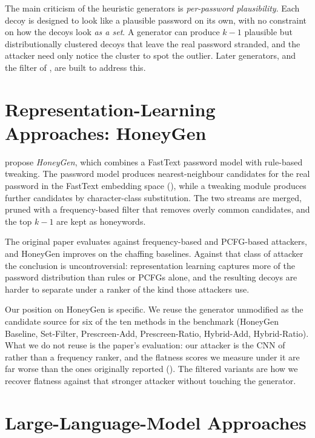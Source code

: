 The main criticism of the heuristic generators is
\emph{per-password plausibility}. Each decoy is designed to look like a
plausible password on its own, with no constraint on how the decoys look
\emph{as a set}. A generator can produce $k-1$ plausible but
distributionally clustered decoys that leave the real password
stranded, and the attacker need only notice the cluster to spot the
outlier. Later generators, and the filter of ,
are built to address this.

\section{Representation-Learning Approaches: HoneyGen}
\label{sec:related-honeygen}

\textcite{dionysiou2021honeygen} propose \emph{HoneyGen}, which combines
a FastText password model with rule-based tweaking. The password model
produces nearest-neighbour candidates for the real password in the
FastText embedding space (), while a tweaking
module produces further candidates by character-class substitution. The
two streams are merged, pruned with a frequency-based filter that
removes overly common candidates, and the top $k-1$ are kept as
honeywords.

The original paper evaluates against frequency-based and PCFG-based
attackers, and HoneyGen improves on the chaffing baselines. Against that
class of attacker the conclusion is uncontroversial: representation
learning captures more of the password distribution than rules or PCFGs
alone, and the resulting decoys are harder to separate under a ranker of
the kind those attackers use.

Our position on HoneyGen is specific. We reuse the generator unmodified
as the candidate source for six of the ten methods in the benchmark
(HoneyGen Baseline, Set-Filter, Prescreen-Add, Prescreen-Ratio,
Hybrid-Add, Hybrid-Ratio). What we do not reuse is the paper's
evaluation: our attacker is the CNN of  rather than a
frequency ranker, and the flatness scores we measure under it are far
worse than the ones originally reported (). The
filtered variants are how we recover flatness against that stronger
attacker without touching the generator.

\section{Large-Language-Model Approaches}
\label{sec:related-llm}


